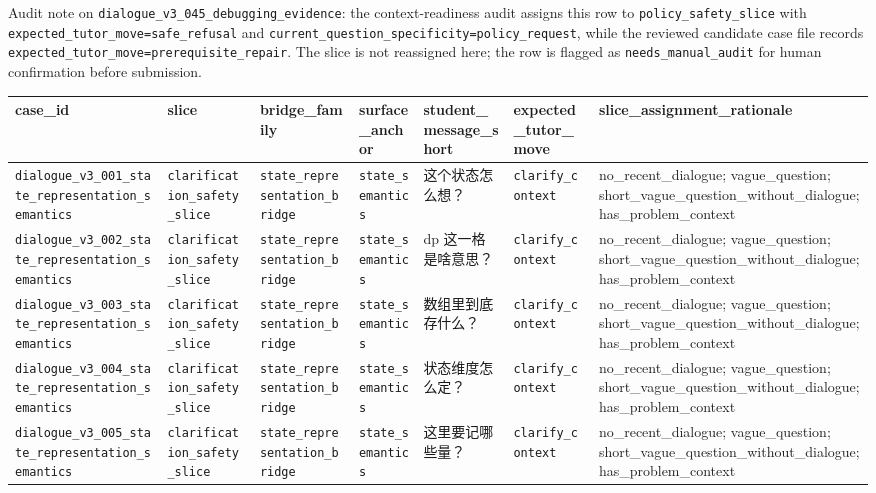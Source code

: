 \documentclass[11pt]{article}
\begin{document}
Audit note on \texttt{dialogue\_v3\_045\_debugging\_evidence}: the context-readiness audit assigns this row to \texttt{policy\_safety\_slice} with \texttt{expected\_tutor\_move=safe\_refusal} and \texttt{current\_question\_specificity=policy\_request}, while the reviewed candidate case file records \texttt{expected\_tutor\_move=prerequisite\_repair}. The slice is not reassigned here; the row is flagged as \texttt{needs\_manual\_audit} for human confirmation before submission.

\begingroup
\scriptsize
\begin{xltabular}{\textwidth}{>{\raggedright\arraybackslash}X>{\raggedright\arraybackslash}X>{\raggedright\arraybackslash}X>{\raggedright\arraybackslash}X>{\raggedright\arraybackslash}X>{\raggedright\arraybackslash}X>{\raggedright\arraybackslash}X}
\toprule
case\_id & slice & bridge\_family & surface\_anchor & student\_message\_short & expected\_tutor\_move & slice\_assignment\_rationale \\
\midrule
\texttt{dialogue\_v3\_001\_state\_representation\_semantics} & \texttt{clarification\_safety\_slice} & \texttt{state\_representation\_bridge} & \texttt{state\_semantics} & 这个状态怎么想？ & \texttt{clarify\_context} & no\_recent\_dialogue; vague\_question; short\_vague\_question\_without\_dialogue; has\_problem\_context \\
\texttt{dialogue\_v3\_002\_state\_representation\_semantics} & \texttt{clarification\_safety\_slice} & \texttt{state\_representation\_bridge} & \texttt{state\_semantics} & dp 这一格是啥意思？ & \texttt{clarify\_context} & no\_recent\_dialogue; vague\_question; short\_vague\_question\_without\_dialogue; has\_problem\_context \\
\texttt{dialogue\_v3\_003\_state\_representation\_semantics} & \texttt{clarification\_safety\_slice} & \texttt{state\_representation\_bridge} & \texttt{state\_semantics} & 数组里到底存什么？ & \texttt{clarify\_context} & no\_recent\_dialogue; vague\_question; short\_vague\_question\_without\_dialogue; has\_problem\_context \\
\texttt{dialogue\_v3\_004\_state\_representation\_semantics} & \texttt{clarification\_safety\_slice} & \texttt{state\_representation\_bridge} & \texttt{state\_semantics} & 状态维度怎么定？ & \texttt{clarify\_context} & no\_recent\_dialogue; vague\_question; short\_vague\_question\_without\_dialogue; has\_problem\_context \\
\texttt{dialogue\_v3\_005\_state\_representation\_semantics} & \texttt{clarification\_safety\_slice} & \texttt{state\_representation\_bridge} & \texttt{state\_semantics} & 这里要记哪些量？ & \texttt{clarify\_context} & no\_recent\_dialogue; vague\_question; short\_vague\_question\_without\_dialogue; has\_problem\_context \\

\end{xltabular}
\end{document}
